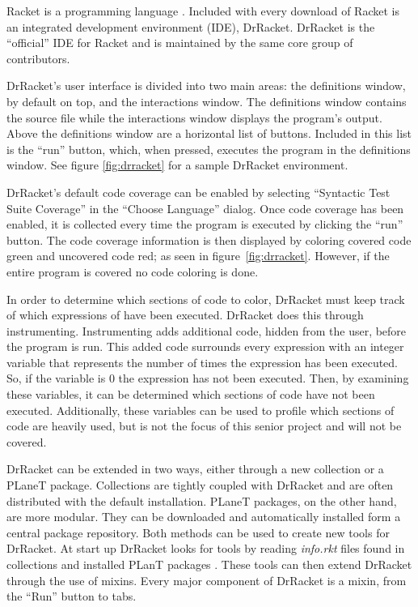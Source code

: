 Racket is a programming language \cite{racket}. Included with every download of Racket is an integrated development environment (IDE), DrRacket. DrRacket is the ``official'' IDE for Racket and is maintained by the same core group of contributors. 

DrRacket's user interface is divided into two main areas: the definitions window, by default on top, and the interactions window. The definitions window contains the source file while the interactions window displays the program's output. Above the definitions window are a horizontal list of buttons. Included in this list is the ``run'' button, which, when pressed, executes the program in the definitions window. See figure \ref{fig:drracket} for a sample DrRacket environment.


DrRacket's default code coverage can be enabled by selecting ``Syntactic Test Suite Coverage'' in the ``Choose Language'' dialog. Once code coverage has been enabled, it is collected every time the program is executed by clicking the ``run'' button. The code coverage information is then displayed by coloring covered code green and uncovered code red; as seen in figure~\ref{fig:drracket}. However, if the entire program is covered no code coloring is done.

In order to determine which sections of code to color, DrRacket must keep track of which expressions of have been executed. DrRacket does this through instrumenting. Instrumenting adds additional code, hidden from the user, before the program is run. This added code surrounds every expression with an integer variable that represents the number of times the expression has been executed. So, if the variable is 0 the expression has not been executed. Then, by examining these variables, it can be determined which sections of code have not been executed. Additionally, these variables can be used to profile which sections of code are heavily used, but is not the focus of this senior project and will not be covered. 

DrRacket can be extended in two ways, either through a new collection or a PLaneT package. Collections are tightly coupled with DrRacket and are often distributed with the default installation. PLaneT packages, on the other hand, are more modular. They can be downloaded and automatically installed form a central package repository. Both methods can be used to create new tools for DrRacket. At start up DrRacket looks for tools by reading \emph{info.rkt} files found in collections and installed PLanT packages \cite{plugin}. These tools can then extend DrRacket through the use of mixins. Every major component of DrRacket is a mixin, from the ``Run'' button to tabs. 
